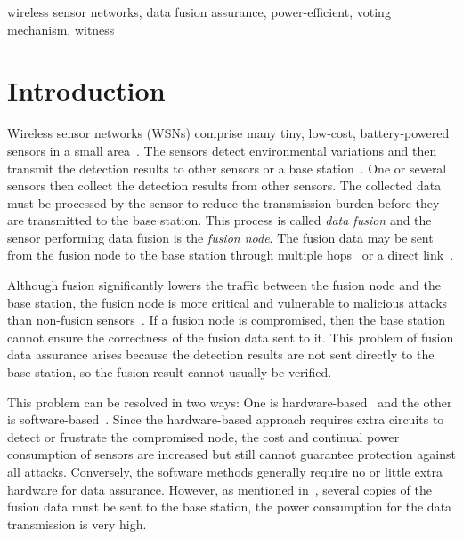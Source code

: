 \documentclass[12pt, onecolumn, draftcls]{IEEEtran}
\begin{document}
\begin{keywords}
\noindent wireless sensor networks, data fusion assurance,
power-efficient, voting mechanism, witness
\end{keywords}

\newpage

\section{Introduction}
\label{sec:introduction} Wireless sensor networks (WSNs) comprise
many tiny, low-cost, battery-powered sensors in a small
area~\cite{akyildiz:wsn,culler:wsn,sohrabi:wsn_sa,alkaraki:wsn_routing,
sivrikaya:wsn_sync,niculescu:wsn_pos,niculescu:wsn_comm}. The
sensors detect environmental variations and then transmit the
detection results to other sensors or a base
station~\cite{aldosari:dd,chamberland:dd_power,tsitsiklis:dd,dan:dct,costa:dc}.
One or several sensors then collect the detection results from other
sensors. The collected data must be processed by the sensor to
reduce the transmission burden before they are transmitted to the
base station. This process is called {\it data fusion} and the
sensor performing data fusion is the {\it fusion node}. The fusion
data may be sent from the fusion node to the base station through
multiple hops~\cite{lin:multi-hops} or a direct
link~\cite{shen:sina}.

Although fusion significantly lowers the traffic between the fusion
node and the base station, the fusion node is more critical and
vulnerable to malicious attacks than non-fusion
sensors~\cite{sholander:assurance,perrig:wsn_security,olariu:ia}. If
a fusion node is compromised, then the base station cannot ensure
the correctness of the fusion data sent to it. This problem of
fusion data assurance arises because the detection results are not
sent directly to the base station, so the fusion result cannot
usually be verified.

This problem can be resolved in two ways: One is
hardware-based~\cite{anderson:tamper,olariu:virtual} and the other
is software-based~\cite{przydatek:aggregation,
deng:assurance,du:assurance}. Since the hardware-based approach
requires extra circuits to detect or frustrate the compromised node,
the cost and continual power consumption of sensors are increased
but still cannot guarantee protection against all attacks.
Conversely, the software methods generally require no or little
extra hardware for data assurance. However, as mentioned
in~\cite{przydatek:aggregation, deng:assurance}, several copies of
the fusion data must be sent to the base station, the power
consumption for the data transmission is very high.
\end{document}
